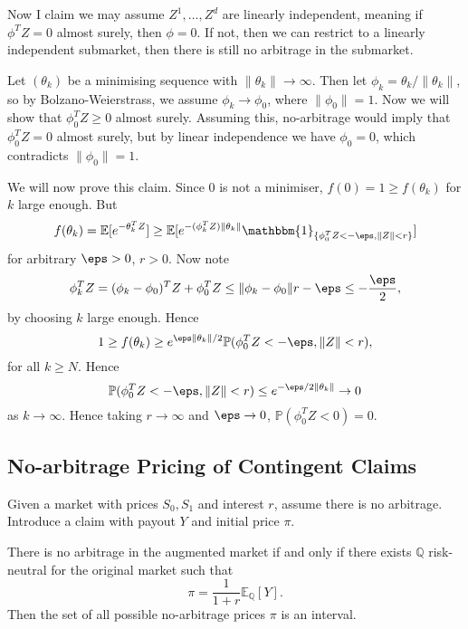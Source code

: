 \documentclass[12pt]{article}
\begin{document}
\begin{proofbox}
\begin{enumerate}
			Now I claim we may assume $Z^1, \ldots, Z^d$ are linearly independent, meaning if $\phi^{T}Z = 0$ almost surely, then $\phi = 0$. If not, then we can restrict to a linearly independent submarket, then there is still no arbitrage in the submarket.

			Let $(\theta_k)$ be a minimising sequence with $\|\theta_k\| \to \infty$. Then let $\phi_k = \theta_k/\|\theta_k\|$, so by Bolzano-Weierstrass, we assume $\phi_k \to \phi_0$, where $\|\phi_0\| = 1$. Now we will show that $\phi_0^{T}Z \geq 0$ almost surely. Assuming this, no-arbitrage would imply that $\phi_0^{T}Z = 0$ almost surely, but by linear independence we have $\phi_0 = 0$, which contradicts $\|\phi_0\| = 1$.

			We will now prove this claim. Since $0$ is not a minimiser, $f(0) = 1 \geq f(\theta_k)$ for $k$ large enough. But
			\[
				f(\theta_k) = \mathbb{E}[e^{-\theta_k^{T}Z}] \geq \mathbb{E}[e^{-(\phi_k^{T}Z)\|\theta_k\|} \mathbbm{1}_{\{\phi_0^{T}Z < -\eps, \|Z\| < r\}}]
			\]
			for arbitrary $\eps > 0$, $r > 0$. Now note
			\[
			\phi_k^{T} Z = (\phi_k - \phi_0)^{T} Z + \phi_0^{T} Z \leq \|\phi_k - \phi_0\|r - \eps \leq - \frac{\eps}{2},
			\]
			by choosing $k$ large enough. Hence
			\[
			1 \geq f(\theta_k) \geq e^{\eps \|\theta_k\|/2} \mathbb{P}(\phi_0^{T} Z < -\eps, \|Z\| < r),
			\]
			for all $k \geq N$. Hence
			\[
			\mathbb{P}(\phi_0^{T} Z < -\eps, \|Z\| < r) \leq e^{-\eps/2 \|\theta_k\|} \to 0
			\]
			as $k \to \infty$. Hence taking $r \to \infty$ and $\eps \to 0$, $\mathbb{P}(\phi_0^{T} Z < 0) = 0$.
	\end{enumerate}
\end{proofbox}

\subsection{No-arbitrage Pricing of Contingent Claims}
\label{sub:no_arb_price}

\begin{theorem}
	Given a market with prices $S_0, S_1$ and interest $r$, assume there is no arbitrage. Introduce a claim with payout $Y$ and initial price $\pi$.

	There is no arbitrage in the augmented market if and only if there exists $\mathbb{Q}$ risk-neutral for the original market such that
	\[
	\pi = \frac{1}{1+r} \mathbb{E}_{\mathbb{Q}}[Y].
	\]
	Then the set of all possible no-arbitrage prices $\pi$ is an interval.
\end{theorem}
\end{document}

